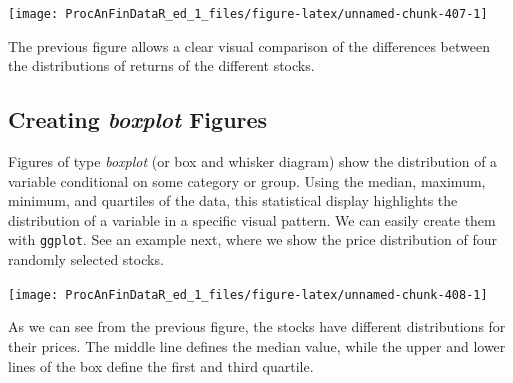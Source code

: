 \documentclass[11pt,]{book}
\newenvironment{Shaded}{\begin{snugshade}}{\end{snugshade}}
\newcommand{\KeywordTok}[1]{\textcolor[rgb]{0.27,0.27,0.27}{\textbf{#1}}}
\newcommand{\DataTypeTok}[1]{\textcolor[rgb]{0.27,0.27,0.27}{#1}}
\newcommand{\DecValTok}[1]{\textcolor[rgb]{0.06,0.06,0.06}{#1}}
\newcommand{\StringTok}[1]{\textcolor[rgb]{0.5,0.5,0.5}{#1}}
\newcommand{\CommentTok}[1]{\textcolor[rgb]{0.56,0.35,0.01}{\textit{#1}}}
\newcommand{\OperatorTok}[1]{\textcolor[rgb]{0.81,0.36,0.00}{\textbf{#1}}}
\newcommand{\NormalTok}[1]{#1}
\begin{document}
\begin{center}\texttt{[image: ProcAnFinDataR\_ed\_1\_files/figure-latex/unnamed-chunk-407-1]} \end{center}

The previous figure allows a clear visual comparison of the differences
between the distributions of returns of the different stocks.

\subsection{\texorpdfstring{Creating \emph{boxplot}
Figures}{Creating boxplot Figures}}\label{creating-boxplot-figures}

Figures of type \emph{boxplot} (or box and whisker diagram) show the
distribution of a variable conditional on some category or group. Using
the median, maximum, minimum, and quartiles of the data, this
statistical display highlights the distribution of a variable in a
specific visual pattern. We can easily create them with \texttt{ggplot}.
See an example next, where we show the price distribution of four
randomly selected stocks.

\begin{Shaded}
\end{Shaded}

\begin{center}\texttt{[image: ProcAnFinDataR\_ed\_1\_files/figure-latex/unnamed-chunk-408-1]} \end{center}

As we can see from the previous figure, the stocks have different
distributions for their prices. The middle line defines the median
value, while the upper and lower lines of the box define the first and
third quartile.
\end{document}
